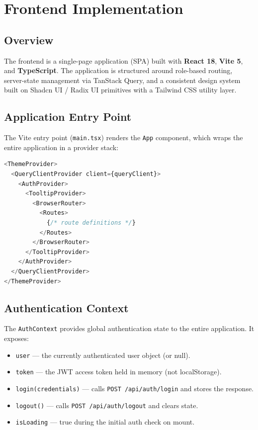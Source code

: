 \chapter{Frontend Implementation}

\section{Overview}

The \projectname{} frontend is a single-page application (SPA) built with \textbf{React 18}, \textbf{Vite 5}, and \textbf{TypeScript}. The application is structured around role-based routing, server-state management via TanStack Query, and a consistent design system built on Shadcn UI / Radix UI primitives with a Tailwind CSS utility layer.

\section{Application Entry Point}

The Vite entry point (\texttt{main.tsx}) renders the \texttt{App} component, which wraps the entire application in a provider stack:

\begin{lstlisting}[language=TypeScript, caption={App.tsx Provider Stack (Simplified)}]
<ThemeProvider>
  <QueryClientProvider client={queryClient}>
    <AuthProvider>
      <TooltipProvider>
        <BrowserRouter>
          <Routes>
            {/* route definitions */}
          </Routes>
        </BrowserRouter>
      </TooltipProvider>
    </AuthProvider>
  </QueryClientProvider>
</ThemeProvider>
\end{lstlisting}

\section{Authentication Context}

The \texttt{AuthContext} provides global authentication state to the entire application. It exposes:

\begin{itemize}
  \item \texttt{user} --- the currently authenticated user object (or null).
  \item \texttt{token} --- the JWT access token held in memory (not localStorage).
  \item \texttt{login(credentials)} --- calls \texttt{POST /api/auth/login} and stores the response.
  \item \texttt{logout()} --- calls \texttt{POST /api/auth/logout} and clears state.
  \item \texttt{isLoading} --- true during the initial auth check on mount.
\end{itemize}

